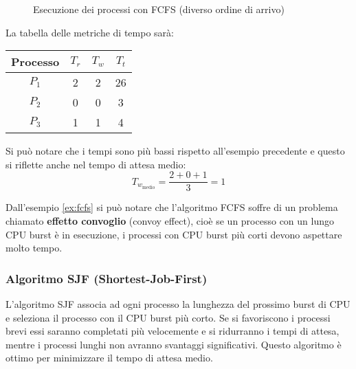\documentclass[a4paper]{article}
\begin{document}
\begin{example}
\begin{figure}[H]
    \caption{Esecuzione dei processi con FCFS (diverso ordine di arrivo)}
  \end{figure}

  \noindent
  La tabella delle metriche di tempo sarà:
  \begin{table}[H]
    \centering
    \begin{tabular}{c|c|c|c}
      Processo & \( T_r \) & \( T_w \) & \( T_t \) \\
      \hline
      \( P_1 \) & 2 & 2 & 26 \\
      \( P_2 \) & 0 & 0 & 3 \\
      \( P_3 \) & 1 & 1 & 4 \\
    \end{tabular}
  \end{table}

  \noindent
  Si può notare che i tempi sono più bassi rispetto all'esempio precedente e questo si
  riflette anche nel tempo di attesa medio:
  \[
    T_{w_{\text{medio}}} = \frac{2 + 0 + 1}{3} = 1
  \]
\end{example}

\noindent
Dall'esempio \ref{ex:fcfs} si può notare che l'algoritmo FCFS soffre di un problema
chiamato \textbf{effetto convoglio} (convoy effect), cioè se un processo con un lungo
CPU burst è in esecuzione, i processi con CPU burst più corti devono aspettare molto
tempo.

\subsubsection{Algoritmo SJF (Shortest-Job-First)}
L'algoritmo SJF associa ad ogni processo la lunghezza del prossimo burst di CPU e
seleziona il processo con il CPU burst più corto. Se si favoriscono i processi brevi
essi saranno completati più velocemente e si ridurranno i tempi di attesa, mentre
i processi lunghi non avranno svantaggi significativi. Questo algoritmo è ottimo
per minimizzare il tempo di attesa medio.
\end{document}
